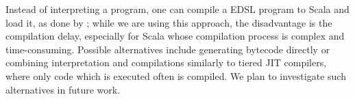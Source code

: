 Instead of interpreting a program, one can compile a EDSL program to Scala and load it, as done by \citet{Rompf11BBlocks};
while we are using this approach, the disadvantage is the compilation delay,
especially for Scala whose compilation process is complex and time-consuming.
Possible alternatives include generating bytecode directly or combining
interpretation and compilations similarly to tiered JIT compilers, where only
code which is executed often is compiled. We plan to investigate such
alternatives in future work.


%
%
%
%

